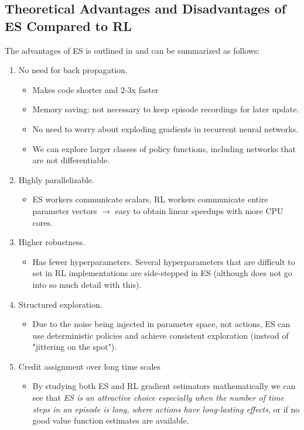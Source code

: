 \subsection{Theoretical Advantages and Disadvantages of ES Compared to RL}
The advantages of ES is outlined in \cite{Karpathy} and can be summarized as follows:
\begin{enumerate}
    \item No need for back propagation.
    \begin{itemize}
        \item Makes code shorter and 2-3x faster
        \item Memory saving: not necessary to keep episode recordings for later update.
        \item No need to worry about exploding gradients in recurrent neural networks.
        \item We can explore larger classes of policy functions, including networks that are not differentiable.
    \end{itemize}
    \item Highly parallelizable.
    \begin{itemize}
        \item ES workers communicate scalars, RL workers communicate entire parameter vectors $\rightarrow$ easy to obtain linear speedups with more CPU cores.
    \end{itemize}
    \item Higher robustness.
    \begin{itemize}
        \item Has fewer hyperparameters. Several hyperparameters that are difficult to set in RL implementations are side-stepped in ES (although \cite{Karpathy} does not go into so much detail with this).
    \end{itemize}

    \item Structured exploration.
    \begin{itemize}
        \item Due to the noise being injected in parameter space, not actions, ES can use deterministic policies and achieve consistent exploration (instead of "jittering on the spot"). 
    \end{itemize}
    \item Credit assignment over long time scales
    \begin{itemize}
        \item By studying both ES and RL gradient estimators mathematically we can see that \emph{ES is an attractive choice especially when the number of time steps in an episode is long, where actions have long-lasting effects}, or if no good value function estimates are available.
    \end{itemize}
\end{enumerate}

